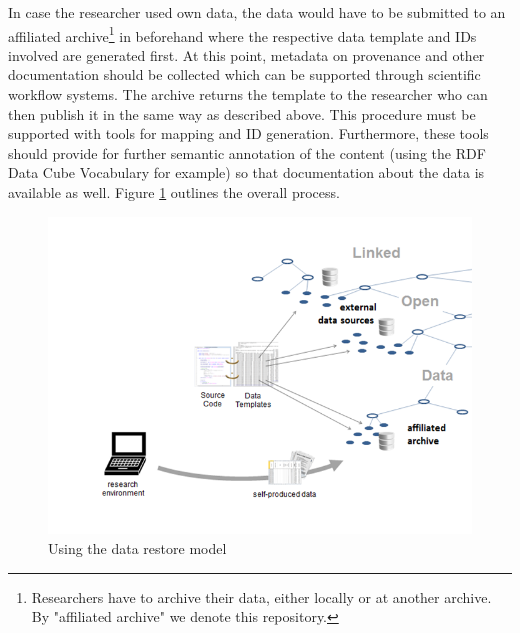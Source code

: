 \documentclass{sig-alternate}
\begin{document}
In case the researcher used own data, the data would have to be submitted to an affiliated archive\footnote{Researchers have to archive their data, either locally or at another archive. By "affiliated archive" we denote this repository.} in beforehand where the respective data template and IDs involved are generated first.
At this point, metadata on provenance and other documentation should be collected which can be supported through scientific workflow systems\cite{cau21112}.
The archive returns the template to the researcher who can then publish it in the same way as described above.
This procedure must be supported with tools for mapping and ID generation.
Furthermore, these tools should provide for further semantic annotation of the content (using the RDF Data Cube Vocabulary for example) so that documentation about the data is available as well.
Figure \ref{fig:modelprocessing} outlines the overall process.




\begin{figure}[htb]
\centering
\includegraphics[width=.48\textwidth]{img/fig-model-processing.png}
\caption{
Using the data restore model
}
\label{fig:modelprocessing}
\end{figure}


\end{document}
